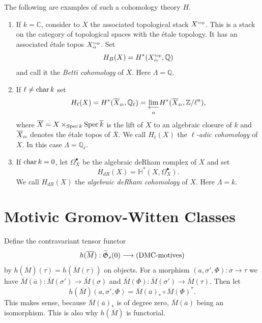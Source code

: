\documentclass[11pt]{amsart}
\theoremstyle{definition}
\theoremstyle{remark}
\newcommand{\rtext}[1]{\text{\upshape #1}}
\renewcommand{\tilde}{\widetilde}
\newcommand{\et}{\mbox{\tiny \'{e}t}}
\newcommand{\topo}{\mbox{\tiny top}}
\newcommand{\upst}{^{\ast}}
\newcommand{\lst}{_{\ast}}
\newcommand{\com}{^{\scriptscriptstyle\bullet}}
\newcommand{\GG}{{\mathfrak{G}}}
\newcommand{\zz}{{\mathbb{Z}}}
\newcommand{\hh}{{\mathbb{H}}}
\newcommand{\qq}{{\mathbb{Q}}}
\newcommand{\cc}{{\mathbb{C}}}
\newcommand{\qql}{{{\mathbb{Q}}_\ell}}
\newcommand{\chr}{\operatorname{\rm char}\nolimits}
\newcommand{\spec}{\operatorname{\rm Spec}\nolimits}
\renewcommand{\projlim}{\operatorname{{\lim\limits_{
\textstyle\longleftarrow}}}\limits}
\newcommand{\comp}{\mathbin{{\scriptstyle\circ}}}
\newcommand{\ol}{\overline}
\theoremstyle{plain}
\theoremstyle{definition}
\theoremstyle{remark}
\begin{document}
The following are examples of such a cohomology theory \(H\).
\begin{enumerate}
\item If \(k=\cc\), consider to \(X\) the associated topological stack \(X^{\topo}\).
This is a stack on the category of
topological spaces with the \'etale topology. It has an associated \'etale
topos \(X^{\topo}_{\et}\). Set
\[
H_B(X)=H\upst(X^{\topo}_{\et},\qq)
\]
and call it the {\em Betti cohomology }of \(X\). Here \(\Lambda=\qq\).
\item If \(\ell\not=\chr k\) set
\[
H_{\ell}(X)=H\upst(\ol{X}_{\et},\qql)={\displaystyle\projlim\limits_n}
H\upst(\ol{X}_{\et},\zz/\ell^n),
\]
where \(\ol{X}=X\times_{\spec k}\spec \ol{k}\) is the lift of \(X\) to an algebraic
closure of \(k\) and \(\ol{X}_{\et}\)
denotes the \'etale topos of \(\ol{X}\). We call \(H_{\ell}(X)\) the {\em
\(\ell\)-adic cohomology } of \(X\). In this case
\(\Lambda=\qql\).
\item If \(\chr k=0\), let \(\Omega_X\com\) be the algebraic deRham complex of \(X\)
and set
\[
H_{dR}(X)=\hh\upst(X,\Omega_X\com).
\]
We call \(H_{dR}(X)\) the {\em algebraic deRham cohomology }of \(X\). Here
\(\Lambda=k\).
\end{enumerate}

\section{Motivic Gromov-Witten Classes}

Define the contravariant tensor functor
\[
h(\ol{M}):\tilde{\GG}_s(0)\longrightarrow(\rtext{DMC-motives})
\]
by \(h(\ol{M})(\tau)=h(\ol{M}(\tau))\) on objects. For a morphism
\((a,\sigma',\Phi):\sigma\rightarrow\tau\) we have
\(\ol{M}(\ol{a}):\ol{M}(\sigma')\rightarrow\ol{M}(\sigma)\) and
\(\ol{M}(\Phi):\ol{M}(\sigma')\rightarrow\ol{M}(\tau)\).
Then let
\[
h(\ol{M})(a,\sigma',\Phi)=\ol{M}(\ol{a})\lst\comp\ol{M}(\Phi)\upst.
\]
This makes sense, because \(\ol{M}(\ol{a})\lst\) is of degree zero,
\(\ol{M}(\ol{a})\) being an isomorphism. This is also
why \(h(\ol{M})\) is functorial.
\end{document}
